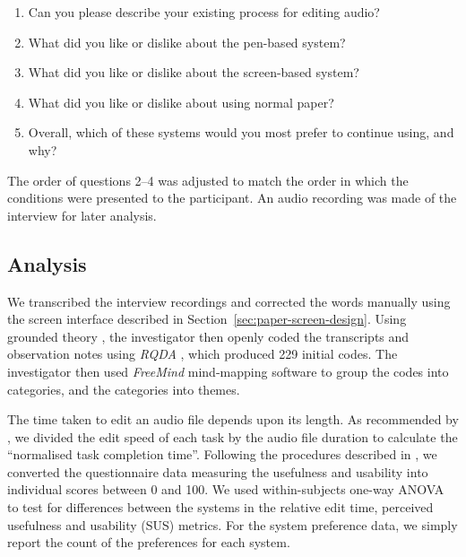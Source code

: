 
{\singlespacing
  \begin{enumerate}
    \item Can you please describe your existing process for editing audio?
    \item What did you like or dislike about the pen-based system?
    \item What did you like or dislike about the screen-based system?
    \item What did you like or dislike about using normal paper?
    \item Overall, which of these systems would you most prefer to continue using, and why?
  \end{enumerate}
}

The order of questions 2--4 was adjusted to match the order in which the conditions were presented to the participant.
An audio recording was made of the interview for later analysis.



\subsection{Analysis}

We transcribed the interview recordings and corrected the words manually using the screen interface described in
Section~\ref{sec:paper-screen-design}.  Using grounded theory \citep{Silverman2016}, the investigator then openly coded
the transcripts and observation notes using \textit{RQDA} \citep{RQDA}, which produced 229 initial codes. The
investigator then used \textit{FreeMind} mind-mapping software to group the codes into categories, and the categories
into themes.

The time taken to edit an audio file depends upon its length.  As recommended by \citet{Dewey2014}, we divided the edit
speed of each task by the audio file duration to calculate the ``normalised task completion time''.  Following the
procedures described in \citet{Davis1989,Brooke1996}, we converted the questionnaire data measuring the usefulness and
usability into individual scores between 0 and 100. We used within-subjects one-way ANOVA \citep{Rouanet1970} to test
for differences between the systems in the relative edit time, perceived usefulness and usability (SUS) metrics.  For
the system preference data, we simply report the count of the preferences for each system.

